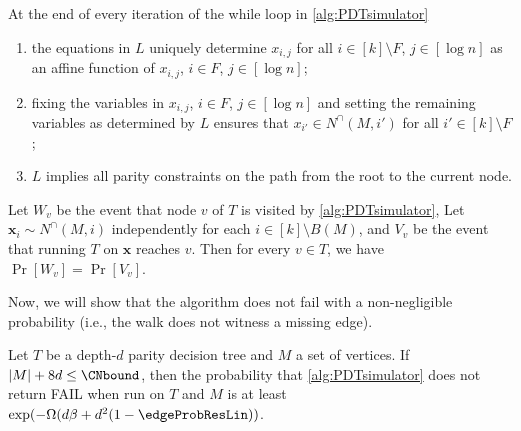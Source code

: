 \begin{lemma}
    \label{lemma:simulation-properties}
    At the end of every iteration of the while loop in \autoref{alg:PDTsimulator}
    \begin{enumerate}
        \item the equations in $L$ uniquely determine $x_{i,j}$ for all $i\in[k]\setminus F$, $j\in [{\log n}]$ as an affine function of $x_{i,j}$, $i\in F$, $j\in [{\log n}]$;
        \item fixing the variables in $x_{i,j}$, $i\in F$, $j\in [{\log n}]$ and setting the remaining variables as determined by $L$ ensures that $x_{i'}\in N^\cap(M,i')$ for all ${i'}\in [k]\setminus F$;
        \item $L$ implies all parity constraints on the path from the root to the current node.
    \end{enumerate}
\end{lemma}

\begin{lemma}
\label{lemma:PDTwalkRelation}
Let $W_v$ be the event that node $v$ of $T$ is visited by \autoref{alg:PDTsimulator}, Let $\bm x_i \sim N^\cap(M,i)$ independently for each $i \in [k] \setminus B(M)$, and $V_v$ be the event that running $T$ on $\bm x$ reaches $v$. Then for every $v \in T$, we have $\Pr[W_v] = \Pr[V_v]$. 
\end{lemma}

Now, we will show that the algorithm does not fail with a non-negligible probability (i.e., the walk does not witness a missing edge).

\begin{lemma}
    \label{lemma:pdtSuccessProb}
    Let $T$ be a depth-$d$ parity decision tree and $M$ a set of vertices. If $|M|+8d\leq \CNbound$, then the probability that \autoref{alg:PDTsimulator} does not return FAIL when run on $T$ and  $M$ is at least $\exp(-\Omega(d\beta+d^2(1-\edgeProbResLin))$.
\end{lemma}

